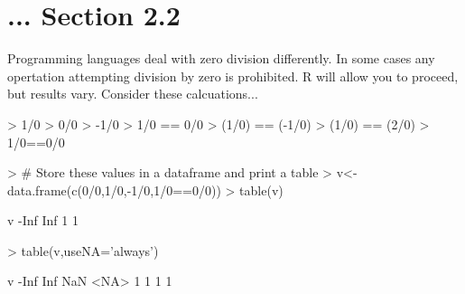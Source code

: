 \documentclass{article}
\begin{document}
\section*{... Section 2.2}
Programming languages deal with zero division differently.  In some cases any opertation attempting division by zero is prohibited.  R will allow you to proceed, but results vary.  Consider these calcuations...
\begin{Schunk}
\begin{Sinput}
> 1/0
> 0/0
> -1/0
> 1/0 == 0/0
> (1/0) == (-1/0)
> (1/0) == (2/0)
> 1/0==0/0
\end{Sinput}
\end{Schunk}
\begin{Schunk}
\begin{Sinput}
> # Store these values in a dataframe and print a table
> v<-data.frame(c(0/0,1/0,-1/0,1/0==0/0))
> table(v)
\end{Sinput}
\begin{Soutput}
v
-Inf  Inf 
   1    1 
\end{Soutput}
\begin{Sinput}
> table(v,useNA='always')
\end{Sinput}
\begin{Soutput}
v
-Inf  Inf  NaN <NA> 
   1    1    1    1 
\end{Soutput}
\end{Schunk}
\end{document}

